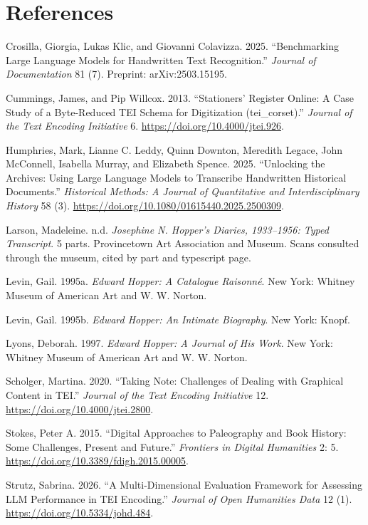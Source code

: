\documentclass[11pt]{article}
\newcommand{\qq}[1]{“#1”}
\begin{document}
\section*{References}
\begin{list}{}{\setlength{\leftmargin}{1.5em}\setlength{\itemindent}{-1.5em}\setlength{\itemsep}{3pt}}
\item Crosilla, Giorgia, Lukas Klic, and Giovanni Colavizza. 2025. \qq{Benchmarking Large Language Models for Handwritten Text Recognition.} \emph{Journal of Documentation} 81 (7). Preprint: arXiv:2503.15195.
\item Cummings, James, and Pip Willcox. 2013. \qq{Stationers' Register Online: A Case Study of a Byte-Reduced TEI Schema for Digitization (tei\_corset).} \emph{Journal of the Text Encoding Initiative} 6. \url{https://doi.org/10.4000/jtei.926}.
\item Humphries, Mark, Lianne C. Leddy, Quinn Downton, Meredith Legace, John McConnell, Isabella Murray, and Elizabeth Spence. 2025. \qq{Unlocking the Archives: Using Large Language Models to Transcribe Handwritten Historical Documents.} \emph{Historical Methods: A Journal of Quantitative and Interdisciplinary History} 58 (3). \url{https://doi.org/10.1080/01615440.2025.2500309}.
\item Larson, Madeleine. n.d. \emph{Josephine N. Hopper's Diaries, 1933--1956: Typed Transcript}. 5 parts. Provincetown Art Association and Museum. Scans consulted through the museum, cited by part and typescript page.
\item Levin, Gail. 1995a. \emph{Edward Hopper: A Catalogue Raisonné}. New York: Whitney Museum of American Art and W. W. Norton.
\item Levin, Gail. 1995b. \emph{Edward Hopper: An Intimate Biography}. New York: Knopf.
\item Lyons, Deborah. 1997. \emph{Edward Hopper: A Journal of His Work}. New York: Whitney Museum of American Art and W. W. Norton.
\item Scholger, Martina. 2020. \qq{Taking Note: Challenges of Dealing with Graphical Content in TEI.} \emph{Journal of the Text Encoding Initiative} 12. \url{https://doi.org/10.4000/jtei.2800}.
\item Stokes, Peter A. 2015. \qq{Digital Approaches to Paleography and Book History: Some Challenges, Present and Future.} \emph{Frontiers in Digital Humanities} 2: 5. \url{https://doi.org/10.3389/fdigh.2015.00005}.
\item Strutz, Sabrina. 2026. \qq{A Multi-Dimensional Evaluation Framework for Assessing LLM Performance in TEI Encoding.} \emph{Journal of Open Humanities Data} 12 (1). \url{https://doi.org/10.5334/johd.484}.

\end{list}
\end{document}
